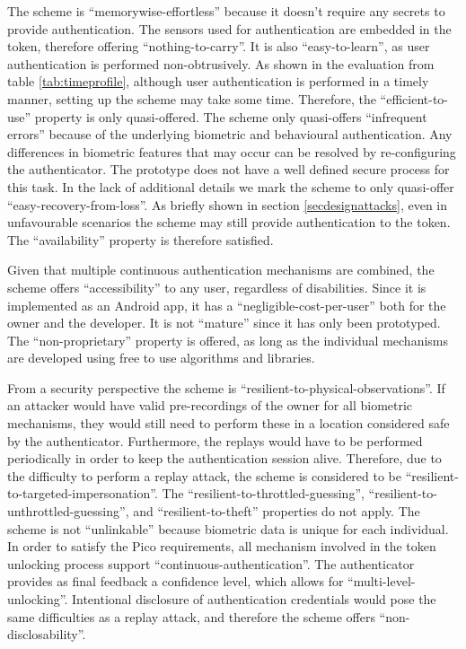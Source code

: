 The scheme is ``memorywise-effortless'' because it doesn't require any secrets to provide authentication. The sensors used for authentication are embedded in the token, therefore offering ``nothing-to-carry''. It is also ``easy-to-learn'', as user authentication is performed non-obtrusively. As shown in the evaluation from table \ref{tab:timeprofile}, although user authentication is performed in a timely manner, setting up the scheme may take some time. Therefore, the ``efficient-to-use'' property is only quasi-offered.  The scheme only quasi-offers ``infrequent errors'' because of the underlying biometric and behavioural authentication. Any differences in biometric features that may occur can be resolved by re-configuring the authenticator. The prototype does not have a well defined secure process for this task. In the lack of additional details we mark the scheme to only quasi-offer ``easy-recovery-from-loss''. As briefly shown in section \ref{secdesignattacks}, even in unfavourable scenarios the scheme may still provide authentication to the token. The ``availability'' property is therefore satisfied.

Given that multiple continuous authentication mechanisms are combined, the scheme offers ``accessibility'' to any user, regardless of disabilities. Since it is implemented as an Android app, it has a ``negligible-cost-per-user'' both for the owner and the developer. It is not ``mature'' since it has only been prototyped. The ``non-proprietary'' property is offered, as long as the individual mechanisms are developed using free to use algorithms and libraries.

From a security perspective the scheme is ``resilient-to-physical-observations''. If an attacker would have valid pre-recordings of the owner for all biometric mechanisms, they would still need to perform these in a location considered safe by the authenticator. Furthermore, the replays would have to be performed periodically in order to keep the authentication session alive. Therefore, due to the difficulty to perform a replay attack, the scheme is considered to be ``resilient-to-targeted-impersonation''. The ``resilient-to-throttled-guessing'', ``resilient-to-unthrottled-guessing'', and ``resilient-to-theft'' properties do not apply. The scheme is not ``unlinkable'' because biometric data is unique for each individual. In order to satisfy the Pico requirements, all mechanism involved in the token unlocking process support ``continuous-authentication''. The authenticator provides as final feedback a confidence level, which allows for ``multi-level-unlocking''. Intentional disclosure of authentication credentials would pose the same difficulties as a replay attack, and therefore the scheme offers ``non-disclosability''.

